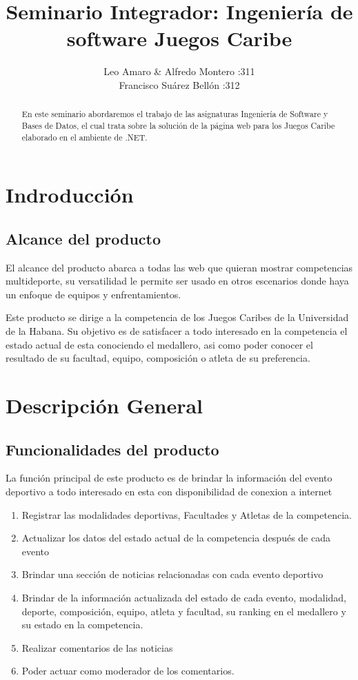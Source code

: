 \documentclass{article} %
\title{\textbf{Seminario Integrador:}
Ingeniería de software \newline Juegos Caribe}
\author{Leo Amaro \& Alfredo Montero :311 \\ Francisco Suárez Bellón :312}
\begin{document}
 
\maketitle 
\begin{abstract} 
En este seminario abordaremos el trabajo de las asignaturas Ingeniería de Software y Bases de Datos, el cual trata sobre la solución de la página web para los Juegos Caribe elaborado en el ambiente de .NET. 
\end{abstract}
 \section{Indroducción}
 \subsection{Alcance del producto}
    El alcance del producto abarca a todas las web que quieran mostrar competencias multideporte, su versatilidad le permite ser usado en otros escenarios donde haya un enfoque de equipos y enfrentamientos.

    Este producto se dirige a la competencia de los Juegos Caribes de la Universidad de la Habana. Su objetivo es de satisfacer a todo interesado en la competencia el estado actual de esta conociendo el medallero, asi como poder conocer el resultado de su facultad, equipo, composición o atleta de su preferencia.
\section{Descripción General}
\subsection{Funcionalidades del producto}
La función principal de este producto es de brindar la información del evento deportivo a todo interesado en esta con disponibilidad de conexion a internet
\begin{enumerate}

    \item Registrar las modalidades deportivas, Facultades y Atletas de la competencia.
    \item Actualizar los datos del estado actual de la competencia después de cada evento
    \item Brindar una sección de noticias relacionadas con cada evento deportivo
    \item Brindar de la información actualizada del estado de cada evento, modalidad, deporte, composición, equipo, atleta y facultad, su ranking en el medallero y su estado en la competencia.
    \item Realizar comentarios de las noticias 
    \item Poder actuar como moderador de los comentarios.
\end{enumerate}
\end{document}
